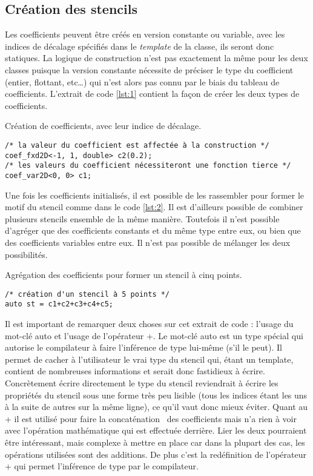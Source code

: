 \subsection{Création des stencils}

Les coefficients peuvent être créés en version constante ou variable, avec les indices de décalage spécifiés dans le \emph{template} de la classe, ils seront donc statiques. La logique de construction n'est pas exactement la même pour les deux classes puisque la version constante nécessite de préciser le type du coefficient (entier, flottant, etc\ldots) qui n'est alors pas connu par le biais du tableau de coefficients. L'extrait de code \ref{lst:1} contient la façon de créer les deux types de coefficients.
\begin{listing}[H]
\caption{Création de coefficients, avec leur indice de décalage.}
\label{lst:1}
\begin{verbatim}
/* la valeur du coefficient est affectée à la construction */
coef_fxd2D<-1, 1, double> c2(0.2);
/* les valeurs du coefficient nécessiteront une fonction tierce */
coef_var2D<0, 0> c1;
\end{verbatim}
\end{listing}

Une fois les coefficients initialisés, il est possible de les rassembler pour former le motif du stencil comme dans le code \ref{lst:2}. Il est d'ailleurs possible de combiner plusieurs stencils ensemble de la même manière. Toutefois il n'est possible d'agréger que des coefficients constants et du même type entre eux, ou bien que des coefficients variables entre eux. Il n'est pas possible de mélanger les deux possibilités.
\begin{listing}[H]
\caption{Agrégation des coefficients pour former un stencil à cinq points.}
\label{lst:2}
\begin{verbatim}
/* création d'un stencil à 5 points */
auto st = c1+c2+c3+c4+c5; 
\end{verbatim}
\end{listing}
Il est important de remarquer deux choses sur cet extrait de code : l'usage du mot-clé \textsf{auto} et l'usage de l'opérateur \textsf{+}. Le mot-clé \textsf{auto} est un type spécial qui autorise le compilateur à faire l'inférence de type lui-même (s'il le peut). Il permet de cacher à l'utilisateur le vrai type du stencil qui, étant un template, contient de nombreuses informations et serait donc fastidieux à écrire. Concrètement écrire directement le type du stencil reviendrait à écrire les propriétés du stencil sous une forme très peu lisible (tous les indices étant les uns à la suite de autres sur la même ligne), ce qu'il vaut donc mieux éviter. Quant au \textsf{+} il est utilisé pour faire la \og concaténation \fg~des coefficients mais n'a rien à voir avec l'opération mathématique qui est effectuée derrière. Lier les deux pourraient être intéressant, mais complexe à mettre en place car dans la plupart des cas, les opérations utilisées sont des additions. De plus c'est la redéfinition de l'opérateur \textsf{+} qui permet l'inférence de type par le compilateur.

